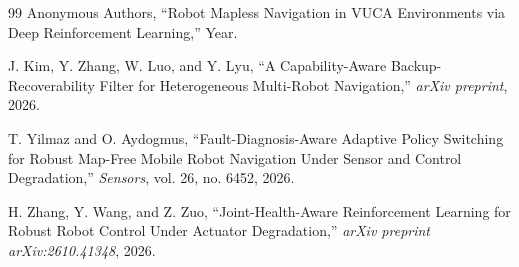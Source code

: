 \documentclass[11pt,a4paper]{article}
\begin{document}
\begin{thebibliography}{99}
Anonymous Authors, ``Robot Mapless Navigation in VUCA Environments via Deep Reinforcement Learning,'' Year.

J. Kim, Y. Zhang, W. Luo, and Y. Lyu, ``A Capability-Aware Backup-Recoverability Filter for Heterogeneous Multi-Robot Navigation,'' \textit{arXiv preprint}, 2026.

T. Yilmaz and O. Aydogmus, ``Fault-Diagnosis-Aware Adaptive Policy Switching for Robust Map-Free Mobile Robot Navigation Under Sensor and Control Degradation,'' \textit{Sensors}, vol. 26, no. 6452, 2026.

H. Zhang, Y. Wang, and Z. Zuo, ``Joint-Health-Aware Reinforcement Learning for Robust Robot Control Under Actuator Degradation,'' \textit{arXiv preprint arXiv:2610.41348}, 2026.

\end{thebibliography}
\end{document}
